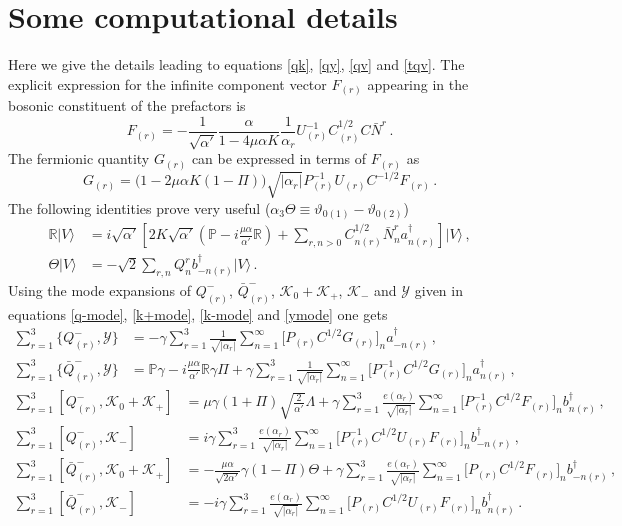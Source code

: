 \documentclass[12pt]{article}
\def\L{\Lambda}
\def\a{\alpha}
\def\g{\gamma}
\def\m{\mu}
\def\vt{\vartheta}
\def\mc{\mathcal}
\def\ra{\rangle}
\def\dg{\dagger}
\numberwithin{equation}{section} \setlength{\textwidth}{17cm}
\begin{document}
\section{Some computational details}\label{appB}
\setcounter{section}{1}
\renewcommand{\thesection}{\Alph{section}}
\setcounter{equation}{0}
Here we give the details leading to equations \eqref{qk}, \eqref{qy}, \eqref{qv} and
\eqref{tqv}. The explicit expression for the infinite component vector $F_{(r)}$ appearing
in the bosonic constituent of the prefactors is
\begin{equation}\label{f+}
F_{(r)}=-\frac{1}{\sqrt{\a'}}\frac{\a}{1-4\m\a K}\frac{1}{\a_r}
U_{(r)}^{-1}C_{(r)}^{1/2}C\bar{N}^r\,.
\end{equation}
The fermionic quantity $G_{(r)}$ can be expressed in terms of $F_{(r)}$ as \cite{ap}
\begin{equation}\label{gf}
G_{(r)}=\bigl(1-2\m\a K(1-\Pi)\bigr)\sqrt{|\a_r|}P_{(r)}^{-1}U_{(r)}C^{-1/2}F_{(r)}\,.
\end{equation}
The following identities prove very useful ($\a_3\Theta\equiv\vt_{0(1)}-\vt_{0(2)}$)
\begin{align}
\label{r}
\mathbb{R}|V\ra & =i\sqrt{\a'}\left[2K\sqrt{\a'}
\left(\mathbb{P}-i\frac{\m\a}{\a'}\mathbb{R}\right)+
\sum_{r,n>0}C_{n(r)}^{1/2}\bar{N}^r_na^{\dg}_{n(r)}\right]|V\ra\,,\\
\label{theta}
\Theta|V\ra & =-\sqrt{2}\sum_{r,n}Q^r_nb_{-n(r)}^{\dg}|V\ra\,.
\end{align}
Using the mode expansions of $Q^-_{(r)}$, $\bar{Q}^-_{(r)}$,
${\mc K}_0+{\mc K}_+$, ${\mc K}_-$ and ${\mc Y}$ given in equations
\eqref{q-mode}, \eqref{k+mode}, \eqref{k-mode} and \eqref{ymode} one gets
\begin{align}
\sum_{r=1}^3\{Q^-_{(r)},{\mc Y}\} & =
-\g\sum_{r=1}^3\frac{1}{\sqrt{|\a_r|}}\sum_{n=1}^{\infty}\bigl[P_{(r)}C^{1/2}G_{(r)}\bigr]_na_{-n(r)}^{\dg}\,,\\
\sum_{r=1}^3\{\bar{Q}^-_{(r)},{\mc Y}\} & = \mathbb{P}\g-i\frac{\m\a}{\a'}\mathbb{R}\g\Pi
+\g\sum_{r=1}^3\frac{1}{\sqrt{|\a_r|}}\sum_{n=1}^{\infty}\bigl[P_{(r)}^{-1}C^{1/2}G_{(r)}\bigr]_na_{n(r)}^{\dg}\,,
\end{align}
\begin{align}
\sum_{r=1}^3[Q^-_{(r)},{\mc K}_0+{\mc K}_+] & = \m\g(1+\Pi)\sqrt{\frac{2}{\a'}}\L+
\g\sum_{r=1}^3\frac{e(\a_r)}{\sqrt{|\a_r|}}\sum_{n=1}^{\infty}\bigl[P_{(r)}^{-1}C^{1/2}F_{(r)}\bigr]_nb_{n(r)}^{\dg}\,,\\
\sum_{r=1}^3[Q^-_{(r)},{\mc K}_-] & = i\g\sum_{r=1}^3\frac{e(\a_r)}{\sqrt{|\a_r|}}
\sum_{n=1}^{\infty}\bigl[P_{(r)}^{-1}C^{1/2}U_{(r)}F_{(r)}\bigr]_nb_{-n(r)}^{\dg}\,,\\
\sum_{r=1}^3[\bar{Q}^-_{(r)},{\mc K}_0+{\mc K}_+] & = -\frac{\m\a}{\sqrt{2\a'}}\g(1-\Pi)\Theta+
\g\sum_{r=1}^3\frac{e(\a_r)}{\sqrt{|\a_r|}}\sum_{n=1}^{\infty}\bigl[P_{(r)}C^{1/2}F_{(r)}\bigr]_nb_{-n(r)}^{\dg}\,,\\
\sum_{r=1}^3[\bar{Q}^-_{(r)},{\mc K}_-] & =-i\g\sum_{r=1}^3\frac{e(\a_r)}{\sqrt{|\a_r|}}
\sum_{n=1}^{\infty}\bigl[P_{(r)}C^{1/2}U_{(r)}F_{(r)}\bigr]_nb_{n(r)}^{\dg}\,.
\end{align}
\end{document}
